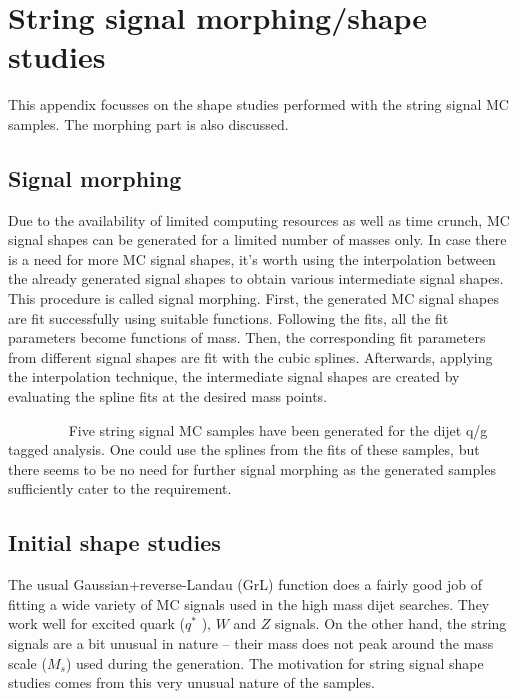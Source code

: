 \section{String signal morphing/shape studies}
\label{sec:StrMorphShapeStudies} 

This appendix focusses on the shape studies performed with the string signal MC samples. The morphing part is also discussed.


\subsection{Signal morphing}
\label{subsec:StrMorphShapeStudies:SigMorph}
Due to the availability of limited computing resources as well as time crunch, MC signal shapes can be generated for a limited number of masses only. In case there is a need for more MC signal shapes, it's worth using the interpolation between the already generated signal shapes to obtain various intermediate signal shapes. This procedure is called signal morphing. First, the generated MC signal shapes are fit successfully using suitable functions. Following the fits, all the fit parameters become functions of mass. Then, the corresponding fit parameters from different signal shapes are fit with the cubic splines. Afterwards, applying the interpolation technique, the intermediate  signal shapes are created by evaluating the spline fits at the desired mass points. 

~~~~~~~~ Five string signal MC samples have been generated for the dijet q/g tagged analysis. One could use the splines from the fits of these samples, but there seems to be no need for further signal morphing as the generated samples sufficiently cater to the requirement.



\subsection{Initial shape studies}
\label{subsec:StrMorphShapeStudies:InitShapStud}

The usual Gaussian+reverse-Landau (GrL) function does a fairly good job of fitting a wide variety of MC signals used in the high mass dijet searches. They work well for excited quark ($q^{*}$ ), $W$ and $Z$ signals. On the other hand, the string signals are a bit unusual in nature -- their mass does not peak around the mass scale ($M_{s}$) used during the generation. The motivation for string signal shape studies comes from this very unusual nature of the samples. 

